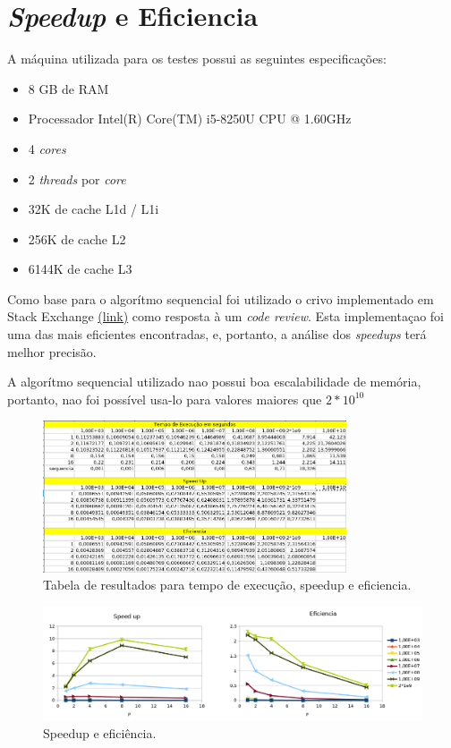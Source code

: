 \documentclass[a4paper, 12 pt]{article}
\begin{document}
\section{\textit{Speedup} e Eficiencia}

A máquina utilizada para os testes possui as seguintes especificações:

\begin{itemize}
  \item 8 GB de RAM
  \item Processador Intel(R) Core(TM) i5-8250U CPU @ 1.60GHz
  \item 4 \textit{cores}
  \item 2 \textit{threads} por \textit{core}
  \item 32K de cache L1d / L1i
  \item 256K de cache L2
  \item 6144K de cache L3
\end{itemize}

Como base para o algorítmo sequencial foi utilizado o crivo implementado em Stack Exchange
\href{ https://codereview.stackexchange.com/questions/112901/eratosthenes-sieve-optimized-in-c}{(link)}
como resposta à um \textit{code review}. Esta implementaçao foi uma das mais eficientes encontradas, e, 
portanto, a análise dos \textit{speedups} terá melhor precisão.

A algorítmo sequencial utilizado nao possui boa escalabilidade de memória, portanto, nao foi possível usa-lo para
valores maiores que $2 * 10^{10}$

\begin{figure}[h]
  \centering
  \includegraphics[width=0.8\textwidth]{figure-1.png}
  \caption{Tabela de resultados para tempo de execução, speedup e eficiencia.}
  \label{fig:table}
\end{figure}

\begin{figure}[h]
    \centering
    \includegraphics[width=1\textwidth]{figure-2.png}
    \caption{Speedup e eficiência.}
    \label{fig:speedups}
\end{figure}
\end{document}
